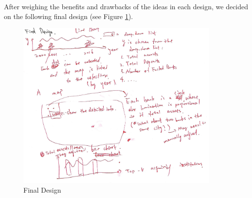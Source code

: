 \documentclass[11pt]{article}
\begin{document}
After weighing the benefits and drawbacks of the ideas in each design, we
decided on the following final design (see Figure \ref{fig:final_design}).

\begin{figure}[!h]
    \centering
    \includegraphics[width=0.9\textwidth]{fig/final_design}
    \caption{Final Design}
    \label{fig:final_design}
\end{figure}
\end{document}
